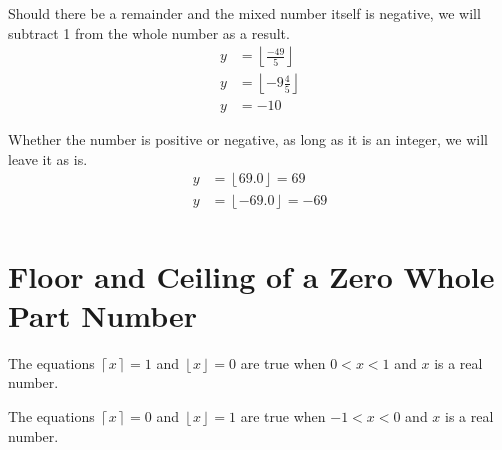 \documentclass[letterpaper, twoside,12pt]{book}
\begin{document}
    Should there be a remainder and the mixed number itself is negative, we will subtract 1 from the whole number as a result.
    \begin{equation*}
        \begin{split}
            y &= \left\lfloor \frac{-49}{5} \right\rfloor \\
            y &= \left\lfloor -9\frac{4}{5} \right\rfloor \\
            y &= -10
        \end{split}
    \end{equation*}

    Whether the number is positive or negative, as long as it is an integer, we will leave it as is.
    \begin{equation*}
        \begin{split}
            y &= \left\lfloor 69.0 \right\rfloor = 69\\
            y &= \left\lfloor -69.0 \right\rfloor = -69\\
        \end{split}
    \end{equation*}

    \section{Floor and Ceiling of a Zero Whole Part Number}
    The equations $\left\lceil x \right\rceil = 1$ and $\left\lfloor x \right\rfloor = 0$ are true when $0 < x < 1$ and $x$ is a real number.

    The equations $\left\lceil x \right\rceil = 0$ and $\left\lfloor x \right\rfloor = 1$ are true when $-1 < x < 0$ and $x$ is a real number.


    \newpage
\end{document}
